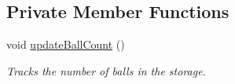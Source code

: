 \subsection*{Private Member Functions}
\begin{DoxyCompactItemize}
\item 
\mbox{\label{classfrc_1_1robot_1_1subsystems_1_1_storage_a8143083be0eb218349ee2dc481e39b9f}} 
void \mbox{\hyperlink{classfrc_1_1robot_1_1subsystems_1_1_storage_a8143083be0eb218349ee2dc481e39b9f}{update\+Ball\+Count}} ()
\begin{DoxyCompactList}\small\item\em Tracks the number of balls in the storage. \end{DoxyCompactList}\end{DoxyCompactItemize}
